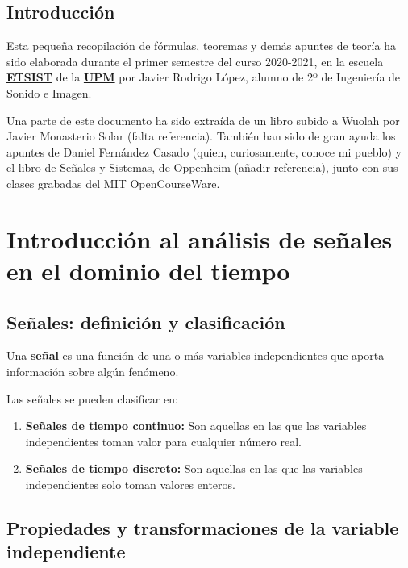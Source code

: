 \documentclass[a4paper]{book}
\begin{document}
\newpage
{}
{}
\section*{Introducción}
\vspace{1em}
Esta pequeña recopilación de fórmulas, teoremas y demás apuntes de teoría ha sido elaborada durante el primer semestre del curso 2020-2021, en la escuela \href{https://www.etsist.upm.es/}{\textbf{ETSIST}} de la \href{http://www.upm.es/}{\textbf{UPM}} por Javier Rodrigo López, alumno de 2º de Ingeniería de Sonido e Imagen.

Una parte de este documento ha sido extraída de un libro subido a Wuolah por Javier Monasterio Solar (falta referencia). También han sido de gran ayuda los apuntes de Daniel Fernández Casado (quien, curiosamente, conoce mi pueblo) y el libro de Señales y Sistemas, de Oppenheim (añadir referencia), junto con sus clases grabadas del MIT OpenCourseWare.
\newpage

\setlength{\parskip}{0em}
\tableofcontents
\setlength{\parskip}{0.5em}

\chapter{Introducción al análisis de señales en el dominio del tiempo}

\section{Señales: definición y clasificación}
Una \textbf{señal} es una función de una o más variables independientes que aporta información sobre algún fenómeno.

Las señales se pueden clasificar en:

\begin{enumerate}
	\item \textbf{Señales de tiempo continuo:} Son aquellas en las que las variables independientes toman valor para cualquier número real.
	\item \textbf{Señales de tiempo discreto:} Son aquellas en las que las variables independientes solo toman valores enteros.
\end{enumerate}


\section{Propiedades y transformaciones de la variable independiente}
\end{document}
